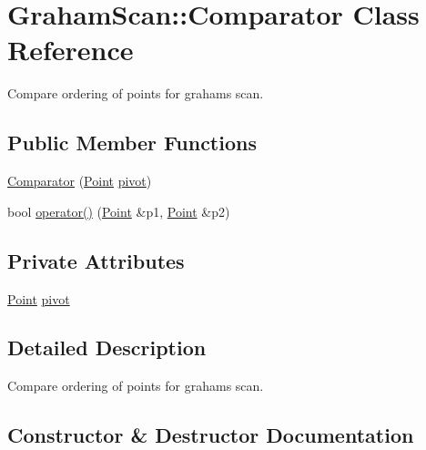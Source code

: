 \hypertarget{classGrahamScan_1_1Comparator}{}\section{Graham\+Scan\+:\+:Comparator Class Reference}
\label{classGrahamScan_1_1Comparator}


Compare ordering of points for graham\textquotesingle{}s scan.  


\subsection*{Public Member Functions}
\begin{DoxyCompactItemize}
\item 
\mbox{\hyperlink{classGrahamScan_1_1Comparator_a8d8fd2d1f831e3d9271a8b5e29dadddf}{Comparator}} (\mbox{\hyperlink{classPoint}{Point}} \mbox{\hyperlink{classGrahamScan_1_1Comparator_ab63927ef091a22dee8e29d8b27f8f7c3}{pivot}})
\item 
bool \mbox{\hyperlink{classGrahamScan_1_1Comparator_a53344fb7ac1cf932b7e348c0a729d9dc}{operator()}} (\mbox{\hyperlink{classPoint}{Point}} \&p1, \mbox{\hyperlink{classPoint}{Point}} \&p2)
\end{DoxyCompactItemize}
\subsection*{Private Attributes}
\begin{DoxyCompactItemize}
\item 
\mbox{\hyperlink{classPoint}{Point}} \mbox{\hyperlink{classGrahamScan_1_1Comparator_ab63927ef091a22dee8e29d8b27f8f7c3}{pivot}}
\end{DoxyCompactItemize}


\subsection{Detailed Description}
Compare ordering of points for graham\textquotesingle{}s scan. 

\subsection{Constructor \& Destructor Documentation}
\mbox{\label{classGrahamScan_1_1Comparator_a8d8fd2d1f831e3d9271a8b5e29dadddf}} 
